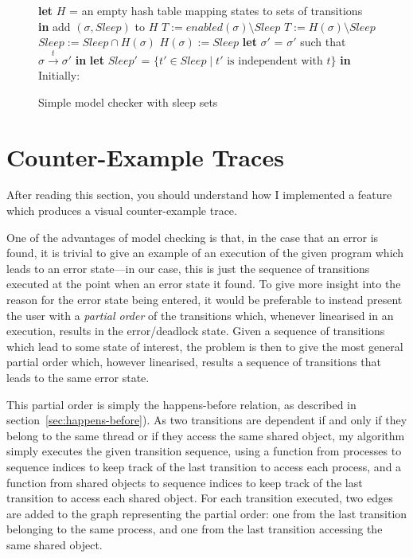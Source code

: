 \documentclass[12pt,a4paper,twoside,openright]{report}
\newcommand{\Let}[2]{\State \textbf{let} #1 = #2 \textbf{in}}
\begin{document}
\begin{figure}
	\begin{algorithmic}[1]
		\Let{$H$}{an empty hash table mapping
			states to sets of transitions}
		\State
				\State add $(\sigma, \textit{Sleep})$ to $H$
				\State$T := \textit{enabled}(\sigma)
					\setminus \textit{Sleep}$
			\Else
				\State$T := H(\sigma) \setminus
					\textit{Sleep}$
				\State $\textit{Sleep} := \textit{Sleep}
					\cap H(\sigma)$
				\State $H(\sigma) := \textit{Sleep}$
			\EndIf
				\Let{$\sigma'$}{$\sigma'$ such that
					$\sigma \xrightarrow{t} \sigma'$}
				\Let{$\textit{Sleep}'$}{$\{t' \in \textit{Sleep}
					\mid t' \text{ is independent with } t\}$}
				\State{}
			\EndFor
		\EndProcedure
		\State
		\State Initially: 
	\end{algorithmic}
	\caption{Simple model checker with sleep sets}
	\label{fig:sleep-code}
\end{figure}

\section{Counter-Example Traces} \label{sec:traces}
After reading this section, you should understand
how I implemented a feature which produces a
visual counter-example trace.

One of the advantages of model checking
is that, in the case that
an error is found, it is trivial to give
an example of an execution of the given
program which leads to an error state---in
our case, this is just the sequence of
transitions executed at the point when
an error state it found.
To give more insight into the reason for the
error state being entered, it would be preferable
to instead present the user with a
\emph{partial order} of the transitions which,
whenever linearised in an execution,
results in the error/deadlock state.
Given a sequence of transitions which lead to
some state of interest, the problem is
then to give the most general partial order
which, however linearised, results a sequence
of transitions that leads to the same error
state.

This partial order is simply the happens-before
relation, as described in
section~\ref{sec:happens-before}). As
two transitions are dependent if and only
if they belong to the same thread or if
they access the same shared object, my
algorithm simply executes the given transition
sequence, using a function from processes
to sequence indices to keep track
of the last transition to access each
process, and a function from shared
objects to sequence indices to keep
track of the last transition to
access each shared object. For each
transition executed, two edges are added
to the graph representing the partial
order: one from the last transition
belonging to the same process, and one
from the last transition accessing the
same shared object.
\end{document}
